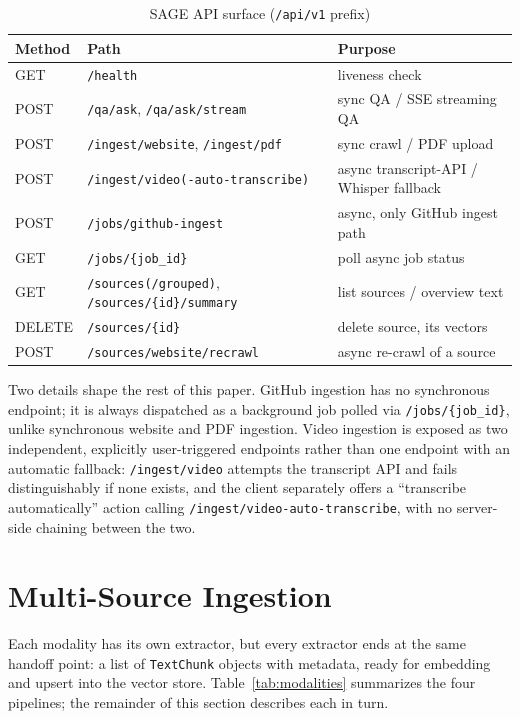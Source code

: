 \documentclass[conference]{IEEEtran}
\begin{document}
\begin{table}[t]
\caption{SAGE API surface (\texttt{/api/v1} prefix)}
\label{tab:endpoints}
\centering
\scriptsize
\begin{tabular}{@{}l>{\raggedright\arraybackslash}p{3.1cm}>{\raggedright\arraybackslash}p{3.0cm}@{}}
\toprule
Method & Path & Purpose \\
\midrule
GET & \texttt{/health} & liveness check \\
POST & \texttt{/qa/ask}, \texttt{/qa/ask/stream} & sync QA / SSE streaming QA \\
POST & \texttt{/ingest/website}, \texttt{/ingest/pdf} & sync crawl / PDF upload \\
POST & \texttt{/ingest/video\allowbreak(-auto-transcribe)} & async transcript-API / Whisper fallback \\
POST & \texttt{/jobs/github-ingest} & async, only GitHub ingest path \\
GET & \texttt{/jobs/\{job\_id\}} & poll async job status \\
GET & \texttt{/sources(/grouped)}, \texttt{/sources/\{id\}/summary} & list sources / overview text \\
DELETE & \texttt{/sources/\{id\}} & delete source, its vectors \\
POST & \texttt{/sources/website/recrawl} & async re-crawl of a source \\
\bottomrule
\end{tabular}
\end{table}

Two details shape the rest of this paper. GitHub ingestion has no synchronous endpoint; it is always dispatched as a background job polled via \texttt{/jobs/\{job\_id\}}, unlike synchronous website and PDF ingestion. Video ingestion is exposed as two independent, explicitly user-triggered endpoints rather than one endpoint with an automatic fallback: \texttt{/ingest/video} attempts the transcript API and fails distinguishably if none exists, and the client separately offers a ``transcribe automatically'' action calling \texttt{/ingest/video-auto-transcribe}, with no server-side chaining between the two.

\section{Multi-Source Ingestion}
\label{sec:ingestion}

Each modality has its own extractor, but every extractor ends at the same handoff point: a list of \texttt{TextChunk} objects with metadata, ready for embedding and upsert into the vector store. Table~\ref{tab:modalities} summarizes the four pipelines; the remainder of this section describes each in turn.
\end{document}
